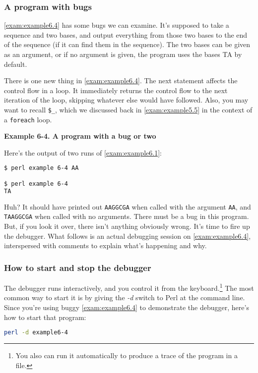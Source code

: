 \subsubsection{A program with bugs}
\autoref{exam:example6.4} has some bugs we can examine. It's supposed to take a sequence and two bases, and output everything from those two bases to the end of the sequence (if it can find them in the sequence). The two bases can be given as an argument, or if no argument is given, the program uses the bases TA by default.

There is one new thing in \autoref{exam:example6.4}. The next statement affects the control flow in a loop. It immediately returns the control flow to the next iteration of the loop, skipping whatever else would have followed.  Also, you may want to recall \verb|$_|, which we discussed back in \autoref{exam:example5.5}
in the context of a \verb|foreach| loop. 

\textbf{Example 6-4. A program with a bug or two}


Here's the output of two runs of \autoref{exam:example6.1}:

\begin{lstlisting}[language=bash]
$ perl example 6-4 AA

$ perl example 6-4
TA
\end{lstlisting}

Huh? It should have printed out \verb|AAGGCGA| when called with the argument \verb|AA|, and \verb|TAAGGCGA| when called with no arguments. There must be a bug in this program. But, if you look it over, there isn't anything obviously wrong. It's time to fire up the debugger. What follows is an actual debugging session on \autoref{exam:example6.4}, interspersed with comments to explain what's happening and why. 

\subsubsection{How to start and stop the debugger}
The debugger runs interactively, and you control it from the keyboard.\footnote{You also can run it automatically to produce a trace of the program in a file.} The most common way to start it is by giving the \textit{-d} switch to Perl at the command line. Since you're using buggy \autoref{exam:example6.4} to demonstrate the debugger, here's how to start that program:

\begin{lstlisting}[language=bash]
perl -d example6-4
\end{lstlisting}

